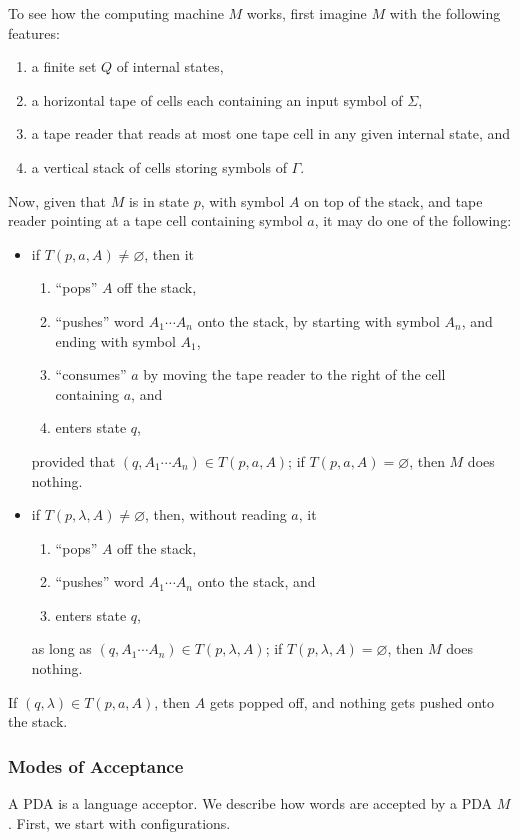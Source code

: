\documentclass[12pt]{article}
\begin{document}
To see how the computing machine $M$ works, first imagine $M$ with the following features:
\begin{enumerate}
\item a finite set $Q$ of internal states, 
\item a horizontal tape of cells each containing an input symbol of $\Sigma$, 
\item a tape reader that reads at most one tape cell in any given internal state, and 
\item a vertical stack of cells storing symbols of $\Gamma$.
\end{enumerate}
Now, given that $M$ is in state $p$, with symbol $A$ on top of the stack, and tape reader pointing at a tape cell containing symbol $a$, it may do one of the following:
\begin{itemize}
\item if $T(p,a,A)\ne \varnothing$, then it
\begin{enumerate}
\item ``pops'' $A$ off the stack, 
\item ``pushes'' word $A_1\cdots A_n$ onto the stack, by starting with symbol $A_n$, and ending with symbol $A_1$, 
\item ``consumes'' $a$ by moving the tape reader to the right of the cell containing $a$, and
\item enters state $q$, 
\end{enumerate}
provided that $(q,A_1\cdots A_n)\in T(p,a,A)$; if $T(p,a,A)=\varnothing$, then $M$ does nothing.
\item if $T(p,\lambda,A)\ne \varnothing$, then, without reading $a$, it 
\begin{enumerate}
\item ``pops'' $A$ off the stack,
\item ``pushes'' word $A_1\cdots A_n$ onto the stack, and 
\item enters state $q$, 
\end{enumerate}
as long as $(q,A_1\cdots A_n)\in T(p,\lambda,A)$; if $T(p,\lambda,A)=\varnothing$, then $M$ does nothing.
\end{itemize}
If $(q,\lambda) \in T(p,a,A)$, then $A$ gets popped off, and nothing gets pushed onto the stack.

\subsubsection*{Modes of Acceptance}

A PDA is a language acceptor.  We describe how words are accepted by a PDA $M$.  First, we start with configurations.
\end{document}
